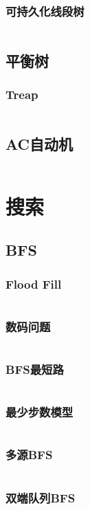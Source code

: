 \documentclass[a4paper,12pt]{article}
\begin{document}
\subsubsection{可持久化线段树}
\inputminted[breaklines]{c++}{ds/last_seg.cc}
\subsection{平衡树}
\subsubsection{Treap}
\inputminted[breaklines]{c++}{ds/treap.cc}
\subsection{AC自动机}
\inputminted[breaklines]{c++}{ds/ac_auto.cc}


\newpage  
\section{搜索}
\subsection{BFS}
\subsubsection{Flood Fill}
\inputminted[breaklines]{c++}{search/bfs/flood.cc}
\subsubsection{数码问题}
\inputminted[breaklines]{c++}{search/bfs/shuma.cc}
\subsubsection{BFS最短路}
\inputminted[breaklines]{c++}{search/bfs/path.cc}
\subsubsection{最少步数模型}
\inputminted[breaklines]{c++}{search/bfs/min_step.cc}
\subsubsection{多源BFS}
\inputminted[breaklines]{c++}{search/bfs/mul_source.cc}
\subsubsection{双端队列BFS}
\inputminted[breaklines]{c++}{search/bfs/deq_bfs.cc}
\end{document}
